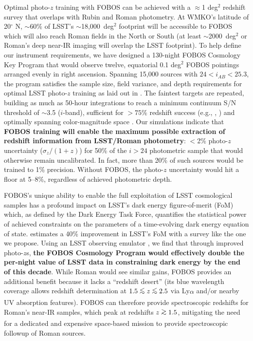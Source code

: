 \documentclass[oneside,11pt]{amsart}
\DeclareRobustCommand{\gtrsim}{%
\mathrel{\hskip-.5em\begin{array}{c}>\\[-8pt]\sim\end{array}\hskip-.5em}}
\DeclareRobustCommand{\lesssim}{%
\mathrel{\hskip-.5em\begin{array}{c}<\\[-8pt]\sim\end{array}\hskip-.5em}}
\begin{document}
Optimal photo-$z$ training with FOBOS can be achieved with a $\approx$1 deg$^2$ redshift survey that overlaps with Rubin and Roman photometry.  At WMKO's latitude of 20$^\circ$ N, $\sim$60\% of LSST's $\sim$18,000~deg$^{2}$ footprint will be accessible to FOBOS which will also reach Roman fields in the North or South (at least $\sim$2000~deg$^{2}$ or Roman's deep near-IR imaging will overlap the LSST footprint).  To help define our instrument requirements, we have designed a 130-night FOBOS Cosmology Key Program that would observe twelve, equatorial 0.1 deg$^2$ FOBOS pointings arranged evenly in right ascension.  Spanning 15,000 sources with $24 < i_{AB} < 25.3$, the program satisfies the sample size, field variance, and depth requirements for optimal LSST photo-$z$ training as laid out in \citet{newman15}.  The faintest targets are repeated, building as much as 50-hour integrations to reach a minimum continuum S/N threshold of $\sim$3.5 ($i$-band), sufficient for $>75$\% redshift success (e.g., \citealp{Newman13}, \citealp{masters19}) and optimally spanning color-magnitude space \citep{masters15, masters19}.  Our simulations indicate that \textbf{FOBOS training will enable the maximum possible extraction of redshift information from LSST/Roman photometry}: $<$2\% photo-$z$ uncertainty ($\sigma_z / (1+z)$) for 50\% of the $i > 24$ photometric sample that would otherwise remain uncalibrated.  In fact, more than 20\% of such sources would be trained to 1\% precision.  Without FOBOS, the photo-$z$ uncertainty would hit a floor at 5--8\%, regardless of achieved photometric depth.





FOBOS's unique ability to enable the full exploitation of LSST cosmological samples has a profound impact on LSST's dark energy figure-of-merit (FoM) which, as defined by the Dark Energy Task Force, quantifies the statistical power of achieved constraints on the parameters of a time-evolving dark energy equation of state.  \citet{newman15} estimates a 40\% improvement in LSST's FoM with a survey like the one we propose.  Using an LSST observing emulator \citep{almoubayyed20}, we find that through improved photo-$z$s, \textbf{the FOBOS Cosmology Program would effectively double the per-night value of LSST data in constraining dark energy by the end of this decade}.  While Roman would see similar gains, FOBOS provides an additional benefit because it lacks a ``redshift desert'' (its blue wavelength coverage allows redshift determination at $1.5\lesssim z \lesssim2.5$ via Ly$\alpha$ and/or nearby UV absorption features).  FOBOS can therefore provide spectroscopic redshifts for Roman's near-IR samples, which peak at redshifts $z \gtrsim 1.5$, mitigating the need for a dedicated and expensive space-based mission to provide spectroscopic followup of Roman sources.
\end{document}
